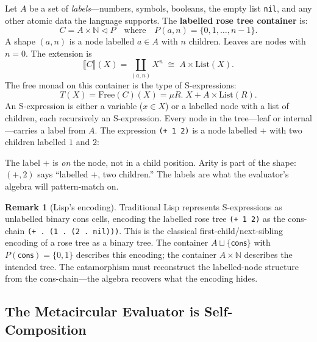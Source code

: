 \documentclass[11pt,a4paper]{article}
\theoremstyle{definition}
\newtheorem{remark}[definition]{Remark}
\theoremstyle{plain}
\newcommand{\cont}[2]{#1 \triangleleft #2}
\newcommand{\Ext}[1]{\llbracket #1 \rrbracket}
\newcommand{\Free}{\mathrm{Free}}
\begin{document}
Let $A$ be a set of \emph{labels}---numbers, symbols, booleans,
the empty list \texttt{nil}, and any other atomic data the language
supports. The \textbf{labelled rose tree container} is:
\[
C = \cont{A \times \mathbb{N}}{P} \quad\text{where}\quad
P(a, n) = \{0, 1, \ldots, n-1\}.
\]
A shape $(a, n)$ is a node labelled $a \in A$ with $n$ children.
Leaves are nodes with $n = 0$. The extension is
\[
\Ext{C}(X) = \coprod_{(a,n)} X^n \;\cong\; A \times \mathrm{List}(X).
\]
The free monad on this container is the type of S-expressions:
\[
T(X) = \Free(C)(X) = \mu R.\; X + A \times \mathrm{List}(R).
\]
An S-expression is either a variable ($x \in X$) or a labelled node
with a list of children, each recursively an S-expression. Every node
in the tree---leaf or internal---carries a label from $A$. The
expression \texttt{(+ 1 2)} is a node labelled $\mathord{+}$ with
two children labelled $1$ and $2$:
\begin{center}
\end{center}
The label $\mathord{+}$ is \emph{on} the node, not in a child
position. Arity is part of the shape: $(\mathord{+}, 2)$ says
``labelled $+$, two children.'' The labels are what the evaluator's
algebra will pattern-match on.

\begin{remark}[Lisp's encoding]
Traditional Lisp represents S-expressions as unlabelled binary cons
cells, encoding the labelled rose tree \texttt{(+ 1 2)} as the
cons-chain \texttt{(+ . (1 . (2 . nil)))}. This is the classical
first-child/next-sibling encoding of a rose tree as a binary tree.
The container $A \sqcup \{\mathsf{cons}\}$ with $P(\mathsf{cons})
= \{0,1\}$ describes this encoding; the container $A \times \mathbb{N}$
describes the intended tree. The catamorphism must reconstruct the
labelled-node structure from the cons-chain---the algebra recovers
what the encoding hides.
\end{remark}

\subsection{The Metacircular Evaluator is Self-Composition}
\end{document}

